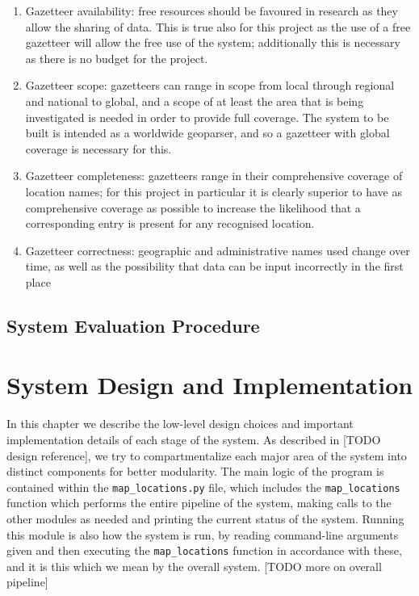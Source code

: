 \documentclass[12pt, a4paper]{report}
\begin{document}
\begin{enumerate}
	\item { Gazetteer availability: free resources should be favoured in research as they allow the sharing of data. This is true also for this project as the use of a free gazetteer will allow the free use of the system; additionally this is necessary as there is no budget for the project. }
	\item { Gazetteer scope: gazetteers can range in scope from local through regional and national to global, and a scope of at least the area that is being investigated is needed in order to provide full coverage. The system to be built is intended as a worldwide geoparser, and so a gazetteer with global coverage is necessary for this. }
	\item { Gazetteer completeness: gazetteers range in their comprehensive coverage of location names; for this project in particular it is clearly superior to have as comprehensive coverage as possible to increase the likelihood that a corresponding entry is present for any recognised location. }
	\item { Gazetteer correctness: geographic and administrative names used change over time, as well as the possibility that data can be input incorrectly in the first place}
\end{enumerate}




\section{System Evaluation Procedure}


\chapter{System Design and Implementation}

In this chapter we describe the low-level design choices and important implementation details of each stage of the system. As described in [TODO design reference], we try to compartmentalize each major area of the system into distinct components for better modularity. The main logic of the program is contained within the \verb#map_locations.py# file, which includes the \verb#map_locations# function which performs the entire pipeline of the system, making calls to the other modules as needed and printing the current status of the system. Running this module is also how the system is run, by reading command-line arguments given and then executing the \verb#map_locations# function in accordance with these, and it is this which we mean by the overall system. [TODO more on overall pipeline]
\end{document}
